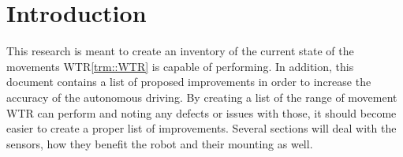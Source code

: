 \section{Introduction}
This research is meant to create an inventory of the current state of the movements WTR\ref{trm::WTR} is capable of performing.
In addition, this document contains a list of proposed improvements in order to increase the accuracy of the autonomous driving.
By creating a list of the range of movement WTR can perform and noting any defects or issues with those, it should become easier to create a proper list of improvements.
Several sections will deal with the sensors, how they benefit the robot and their mounting as well.
\newpage
